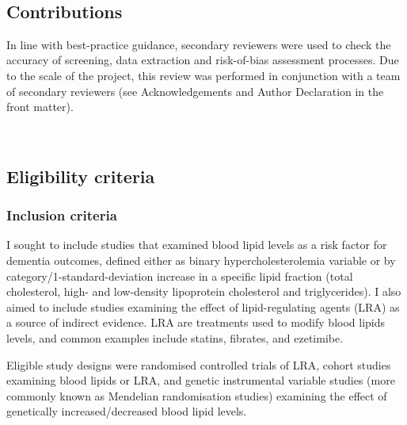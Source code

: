 \documentclass[a4paper, twoside]{templates/ociamthesis}
\begin{document}
~

\hypertarget{contributions}{%
\subsection{Contributions}\label{contributions}}

In line with best-practice guidance, secondary reviewers were used to check the accuracy of screening, data extraction and risk-of-bias assessment processes. Due to the scale of the project, this review was performed in conjunction with a team of secondary reviewers (see Acknowledgements and Author Declaration in the front matter).

~

\hypertarget{eligibility-criteria}{%
\subsection{Eligibility criteria}\label{eligibility-criteria}}

\hypertarget{inclusion-criteria}{%
\subsubsection{Inclusion criteria}\label{inclusion-criteria}}

I sought to include studies that examined blood lipid levels as a risk factor for dementia outcomes, defined either as binary hypercholesterolemia variable or by category/1-standard-deviation increase in a specific lipid fraction (total cholesterol, high- and low-density lipoprotein cholesterol and triglycerides). I also aimed to include studies examining the effect of lipid-regulating agents (LRA) as a source of indirect evidence. LRA are treatments used to modify blood lipids levels, and common examples include statins, fibrates, and ezetimibe.

Eligible study designs were randomised controlled trials of LRA, cohort studies examining blood lipids or LRA, and genetic instrumental variable studies (more commonly known as Mendelian randomisation studies) examining the effect of genetically increased/decreased blood lipid levels.
\end{document}
